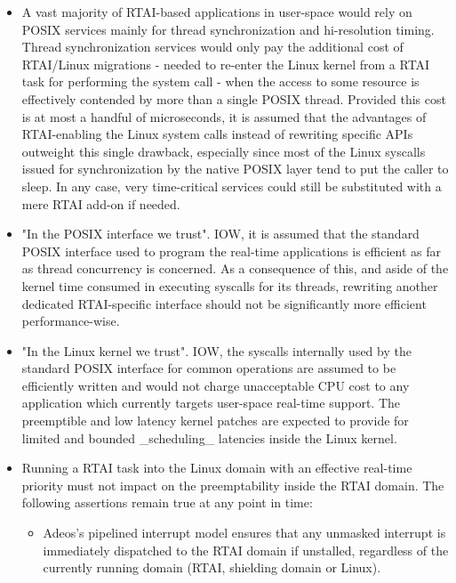 \begin{itemize}

\item A vast majority of RTAI-based applications in user-space would rely
on POSIX services mainly for thread synchronization and hi-resolution
timing. Thread synchronization services would only pay the additional
cost of RTAI/Linux migrations - needed to re-enter the Linux kernel
from a RTAI task for performing the system call - when the access to
some resource is effectively contended by more than a single POSIX
thread. Provided this cost is at most a handful of microseconds, it is
assumed that the advantages of RTAI-enabling the Linux system calls
instead of rewriting specific APIs outweight this single drawback,
especially since most of the Linux syscalls issued for synchronization
by the native POSIX layer tend to put the caller to sleep. In any
case, very time-critical services could still be substituted with a
mere RTAI add-on if needed.

\item "In the POSIX interface we trust". IOW, it is assumed that the
standard POSIX interface used to program the real-time applications is
efficient as far as thread concurrency is concerned. As a consequence
of this, and aside of the kernel time consumed in executing syscalls
for its threads, rewriting another dedicated RTAI-specific interface
should not be significantly more efficient performance-wise.

\item "In the Linux kernel we trust". IOW, the syscalls internally used by
the standard POSIX interface for common operations are assumed to be
efficiently written and would not charge unacceptable CPU cost to any
application which currently targets user-space real-time support. The
preemptible and low latency kernel patches are expected to provide for
limited and bounded \_scheduling\_ latencies inside the Linux kernel.

\item Running a RTAI task into the Linux domain with an effective
real-time priority must not impact on the preemptability inside the
RTAI domain. The following assertions remain true at any point in
time:

        \begin{itemize}
        
        \item Adeos's pipelined interrupt model ensures that any unmasked
        interrupt is immediately dispatched to the RTAI domain if
        unstalled, regardless of the currently running domain (RTAI,
        shielding domain or Linux).


\end{itemize}
\end{itemize}
